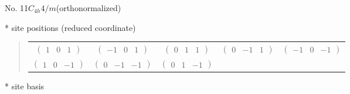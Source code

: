 \documentclass[fleqn,9pt,landscape]{jsarticle}
\begin{document}
\newpage
\begin{center}
\LARGE
No. 11\quad$C_{4h}$\quad$4/m$\quad[ tetragonal ] (orthonormalized)
\end{center}
\vspace{5mm}
* site positions (reduced coordinate)
\begin{quote}
\begin{tabular}{ccccc}
$ \begin{pmatrix} 1 & 0 & 1 \end{pmatrix} $ & $ \begin{pmatrix} -1 & 0 & 1 \end{pmatrix} $ & $ \begin{pmatrix} 0 & 1 & 1 \end{pmatrix} $ & $ \begin{pmatrix} 0 & -1 & 1 \end{pmatrix} $ & $ \begin{pmatrix} -1 & 0 & -1 \end{pmatrix} $ \\
$ \begin{pmatrix} 1 & 0 & -1 \end{pmatrix} $ & $ \begin{pmatrix} 0 & -1 & -1 \end{pmatrix} $ & $ \begin{pmatrix} 0 & 1 & -1 \end{pmatrix} $ & $  $ & $  $
\end{tabular}
\end{quote}
* site basis
\end{document}
